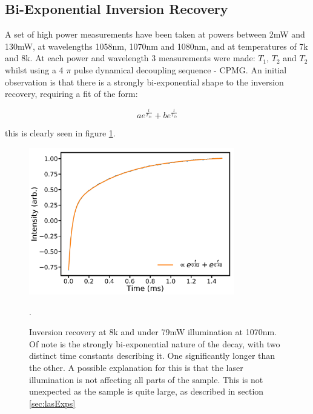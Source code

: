 \subsection{Bi-Exponential Inversion Recovery}

A set of high power measurements have been taken at powers between 2mW and 130mW, at wavelengths 1058nm, 1070nm and 1080nm, and at temperatures of 7k and 8k.
At each power and wavelength 3 measurements were made: $T_1$, $T_2$ and $T_2$ whilst using a 4 $\pi$ pulse dynamical decoupling sequence - CPMG.
An initial observation is that there is a strongly bi-exponential shape to the inversion recovery, requiring a fit of the form:

\begin{equation}
a e^{\frac{t}{T_{1a}}} + b e^{\frac{t}{T_{1b}}}
\end{equation}

this is clearly seen in figure \ref{fig:biexpDec}.

\begin{figure}
\centering
\includegraphics[width=0.8\textwidth]{Figures/T1_biExp.pdf}
\caption[Inversion recovery under laser illumination]{Inversion recovery at 8k and under 79mW illumination at 1070nm. Of note is the strongly bi-exponential nature of the decay, with two distinct time constants describing it. One significantly longer than the other. A possible explanation for this is that the laser illumination is not affecting all parts of the sample. This is not unexpected as the sample is quite large, as described in section \ref{sec:lasExps}}. 
\label{fig:biexpDec}
\end{figure}

